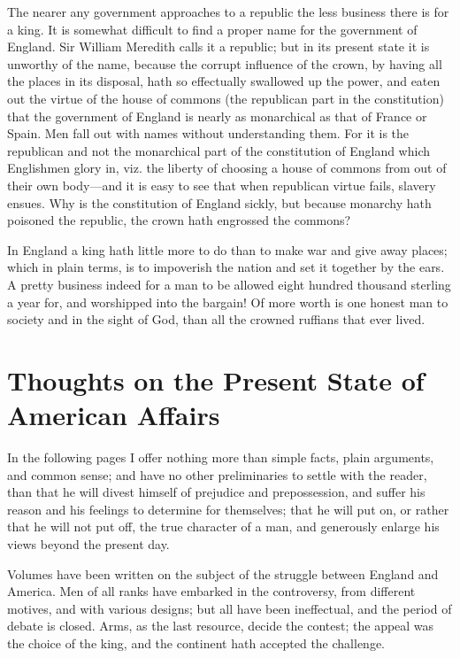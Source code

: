 \documentclass[12pt,oneside]{memoir}
\begin{document}
The nearer any government approaches to a republic the less business there is for a king. It is somewhat difficult to find a proper name for the government of England. Sir William Meredith calls it a republic; but in its present state it is unworthy of the name, because the corrupt influence of the crown, by having all the places in its disposal, hath so effectually swallowed up the power, and eaten out the virtue of the house of commons (the republican part in the constitution) that the government of England is nearly as monarchical as that of France or Spain. Men fall out with names without understanding them. For it is the republican and not the monarchical part of the constitution of England which Englishmen glory in, viz. the liberty of choosing a house of commons from out of their own body---and it is easy to see that when republican virtue fails, slavery ensues. Why is the constitution of England sickly, but because monarchy hath poisoned the republic, the crown hath engrossed the commons?

In England a king hath little more to do than to make war and give away places; which in plain terms, is to impoverish the nation and set it together by the ears. A pretty business indeed for a man to be allowed eight hundred thousand sterling a year for, and worshipped into the bargain! Of more worth is one honest man to society and in the sight of God, than all the crowned ruffians that ever lived.

\section*{Thoughts on the Present State of American Affairs}

In the following pages I offer nothing more than simple facts, plain arguments, and common sense; and have no other preliminaries to settle with the reader, than that he will divest himself of prejudice and prepossession, and suffer his reason and his feelings to determine for themselves; that he will put on, or rather that he will not put off, the true character of a man, and generously enlarge his views beyond the present day.

Volumes have been written on the subject of the struggle between England and America. Men of all ranks have embarked in the controversy, from different motives, and with various designs; but all have been ineffectual, and the period of debate is closed. Arms, as the last resource, decide the contest; the appeal was the choice of the king, and the continent hath accepted the challenge.
\end{document}

